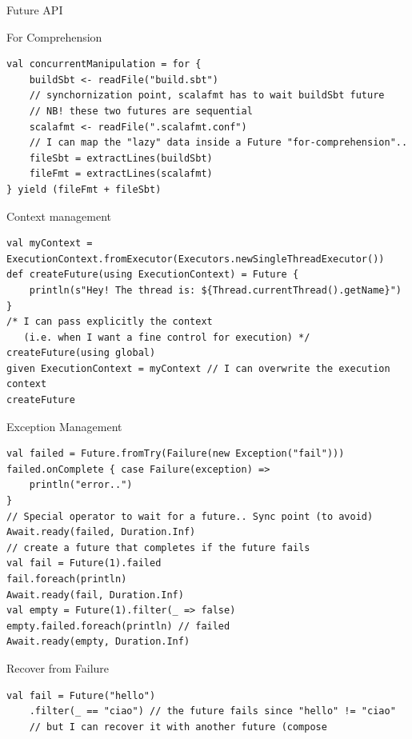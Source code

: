 \documentclass[presentation, 9pt]{beamer}\mode<presentation>{\usetheme{AMSBolognaFC}}
\begin{document}
\begin{frame}{Future API}
\begin{alertblock}{For Comprehension }
\begin{tcolorbox}[left=0pt, top=0pt, bottom=0pt]
\begin{verbatim}
val concurrentManipulation = for {
	buildSbt <- readFile("build.sbt")
	// synchornization point, scalafmt has to wait buildSbt future
	// NB! these two futures are sequential
	scalafmt <- readFile(".scalafmt.conf") 
	// I can map the "lazy" data inside a Future "for-comprehension"..
	fileSbt = extractLines(buildSbt)
	fileFmt = extractLines(scalafmt)
} yield (fileFmt + fileSbt)
					\end{verbatim}
				\end{tcolorbox}
\end{alertblock}
\begin{alertblock}{Context management}
		\begin{tcolorbox}[left=0pt, top=0pt, bottom=0pt]
						\begin{verbatim}
val myContext = ExecutionContext.fromExecutor(Executors.newSingleThreadExecutor())
def createFuture(using ExecutionContext) = Future {
	println(s"Hey! The thread is: ${Thread.currentThread().getName}")
}
/* I can pass explicitly the context 
   (i.e. when I want a fine control for execution) */
createFuture(using global)
given ExecutionContext = myContext // I can overwrite the execution context
createFuture
						\end{verbatim}
					\end{tcolorbox}
\end{alertblock}
\begin{alertblock}{Exception Management}
	\begin{tcolorbox}[left=0pt, top=0pt, bottom=0pt]
		\begin{verbatim}
val failed = Future.fromTry(Failure(new Exception("fail")))
failed.onComplete { case Failure(exception) =>
	println("error..")
}
// Special operator to wait for a future.. Sync point (to avoid)
Await.ready(failed, Duration.Inf)
// create a future that completes if the future fails
val fail = Future(1).failed 
fail.foreach(println)
Await.ready(fail, Duration.Inf)
val empty = Future(1).filter(_ => false)
empty.failed.foreach(println) // failed
Await.ready(empty, Duration.Inf)
		\end{verbatim}
	\end{tcolorbox}
\end{alertblock}
\begin{alertblock}{Recover from Failure}
	\begin{tcolorbox}[left=0pt, top=0pt, bottom=0pt]
		\begin{verbatim}
val fail = Future("hello")
	.filter(_ == "ciao") // the future fails since "hello" != "ciao"
	// but I can recover it with another future (compose

\end{verbatim}
\end{tcolorbox}
\end{alertblock}
\end{frame}
\end{document}

